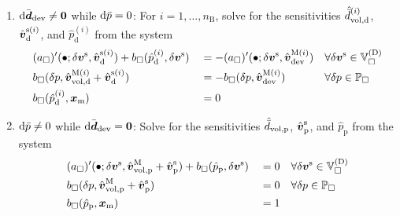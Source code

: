 \documentclass[10pt,a4paper]{article}
\newcommand{\ded}{\mathrm{d}}
\newcommand{\dep}{\mathrm{p}}
\begin{document}
\begin{enumerate}
\item $\operatorname{d \!}\bar{\boldsymbol{d}}_{\mathrm{dev}}\neq \boldsymbol{0}$ while $\operatorname{d \!}\bar{p}=0$: For $i=1,\ldots,n_{\mathrm{B}}$, solve for the sensitivities $\hat{\bar{d}}^{(i)}_{\vol,\ded}$, $\hat{\ta{v}}^{\fluct(i)}_\ded$, and $\hat{p}^{(i)}_\ded$ from the system
\begin{align}
    \label{eq233a} &
    (a_\Box)'(\bullet;\delta\ta{v}^\fluct,\hat{\ta{v}}^{\fluct(i)}_\ded) +
    b_\Box(\hat{p}^{(i)}_\ded,\delta\ta{v}^\fluct)
    && =
    - (a_\Box)'(\bullet;\delta\ta{v}^\fluct,\hat{\ta{v}}^{\macro(i)}_\dev)
    && \forall \delta \ta{v}^\fluct\in\set{V}_\Box^{(\Dirichlet)}
 \\
    \label{eq233b} &
    b_\Box(\delta p,\hat{\ta{v}}^{\macro(i)}_{\vol,\ded}+\hat{\ta{v}}^{\fluct(i)}_\ded)
    && =
    - b_\Box(\delta p,\hat{\ta{v}}^{\macro(i)}_\dev)
    && \forall \delta p\in\set{P}_\Box
\\
    \label{eq233c} &
    b_\Box(\hat{p}^{(i)}_\ded,\ta{x}_\mean)
    && =
    0
    &&
\end{align}

\item $\operatorname{d \!}\bar{p}\neq 0$ while $\operatorname{d \!}\bar{\boldsymbol{d}}_{\mathrm{dev}}=\boldsymbol{0}$: Solve for the sensitivities $\hat{\bar{d}}_{\vol,\dep}$, $\hat{\ta{v}}^{\fluct}_\dep$, and $\hat{p}_\dep$ from the system
\begin{align}
    \label{eq243a} &
    (a_\Box)'(\bullet;\delta\ta{v}^\fluct,\hat{\ta{v}}^{\macro}_{\vol,\dep}+\hat{\ta{v}}^{\fluct}_\dep) +
    b_\Box(\hat{p}_\dep,\delta\ta{v}^\fluct)
    && =
    0
    && \forall \delta \ta{v}^\fluct\in\set{V}_\Box^{(\Dirichlet)}
 \\
    \label{eq243b} &
    b_\Box(\delta p,\hat{\ta{v}}^{\macro}_{\vol,\dep}+\hat{\ta{v}}^{\fluct}_\dep)
    && =
    0
    && \forall \delta p\in\set{P}_\Box
\\
    \label{eq243c} &
    b_\Box(\hat{p}_\dep,\ta{x}_\mean)
    && =
    1
    &&
\end{align}
\end{enumerate}
\end{document}
